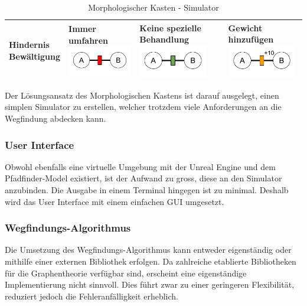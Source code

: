 \documentclass[../main.tex]{subfiles}
\begin{document}
\begin{table}[htbp!]
\begin{tabularx}{\textwidth}{| X | Y | Y | Y |}
        \textbf{Hindernis \newline Bewältigung}   &     
        Immer umfahren \newline
        \includegraphics[width=3cm]{img/simulation/morphologischer-kasten/hindernis-umfahren.png}
        &
        Keine spezielle Behandlung \newline
        \includegraphics[width=3cm]{img/simulation/morphologischer-kasten/hindernis-ignoriert.png}
        &
        Gewicht hinzufügen\newline
        \includegraphics[width=3cm]{img/simulation/morphologischer-kasten/hindernis-gewicht.png}
        \\ \hline
    \end{tabularx}
    \caption{Morphologischer Kasten - Simulator}
\end{table}

Der Lösungsansatz des Morphologischen Kastens ist darauf ausgelegt, einen simplen Simulator zu erstellen, welcher trotzdem viele Anforderungen an die Wegfindung abdecken kann.

\subsubsection{User Interface}

Obwohl ebenfalls eine virtuelle Umgebung mit der Unreal Engine und dem Pfadfinder-Model existiert, ist der Aufwand zu gross, diese an den Simulator anzubinden. Die Ausgabe in einem Terminal hingegen ist zu minimal. Deshalb wird das User Interface mit einem einfachen GUI umgesetzt. 

\subsubsection{Wegfindungs-Algorithmus}

Die Umsetzung des Wegfindungs-Algorithmus kann entweder eigenständig oder mithilfe einer externen Bibliothek erfolgen. Da zahlreiche etablierte Bibliotheken für die Graphentheorie verfügbar sind, erscheint eine eigenständige Implementierung nicht sinnvoll. Dies führt zwar zu einer geringeren Flexibilität, reduziert jedoch die Fehleranfälligkeit erheblich.
\end{document}
